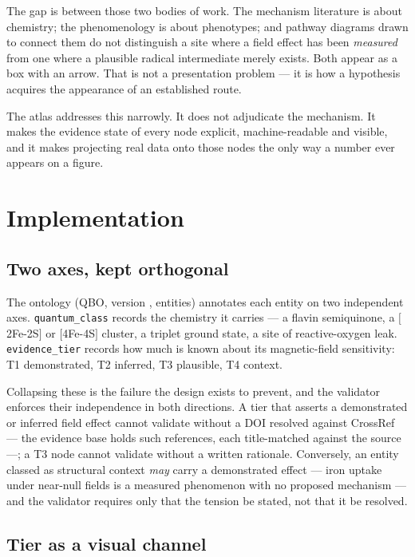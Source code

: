\documentclass[11pt,a4paper]{article}
\begin{document}
The gap is between those two bodies of work. The mechanism literature is about
chemistry; the phenomenology is about phenotypes; and pathway diagrams drawn to connect
them do not distinguish a site where a field effect has been \emph{measured} from one
where a plausible radical intermediate merely exists. Both appear as a box with an
arrow. That is not a presentation problem --- it is how a hypothesis acquires the
appearance of an established route.

The atlas addresses this narrowly. It does not adjudicate the mechanism. It makes the
evidence state of every node explicit, machine-readable and visible, and it makes
projecting real data onto those nodes the only way a number ever appears on a figure.

\section{Implementation}

\subsection{Two axes, kept orthogonal}

The ontology (QBO, version \QboVersion, \NEntities{} entities) annotates each entity on
two independent axes. \texttt{quantum\_class} records the chemistry it carries --- a
flavin semiquinone, a $[$2Fe-2S$]$ or $[$4Fe-4S$]$ cluster, a triplet ground state, a
site of reactive-oxygen leak. \texttt{evidence\_tier} records how much is known about its
magnetic-field sensitivity: T1 demonstrated, T2 inferred, T3 plausible, T4 context.

Collapsing these is the failure the design exists to prevent, and the validator enforces
their independence in both directions. A tier that asserts a demonstrated or inferred
field effect cannot validate without a DOI resolved against CrossRef --- the evidence
base holds \NRefs{} such references, each title-matched against the source ---; a T3 node cannot
validate without a written rationale. Conversely, an entity classed as structural
context \emph{may} carry a demonstrated effect --- iron uptake under near-null fields is
a measured phenomenon with no proposed mechanism \citep{Islam2020,Vigani2021} --- and the
validator requires only that the tension be stated, not that it be resolved.

\subsection{Tier as a visual channel}
\end{document}
